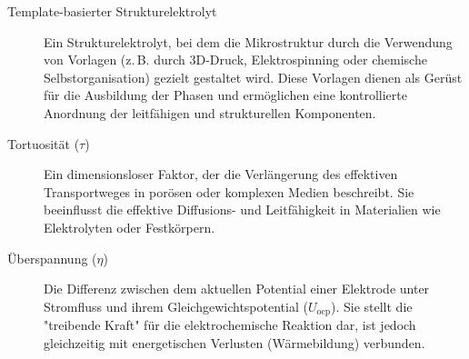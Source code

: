 \begin{description}
    \item[Template-basierter Strukturelektrolyt] Ein Strukturelektrolyt, bei dem die Mikrostruktur durch die Verwendung von Vorlagen (z.\,B. durch 3D-Druck, Elektrospinning oder chemische Selbstorganisation) gezielt gestaltet wird. Diese Vorlagen dienen als Gerüst für die Ausbildung der Phasen und ermöglichen eine kontrollierte Anordnung der leitfähigen und strukturellen Komponenten.

    \item[Tortuosität ($\tau$)] Ein dimensionsloser Faktor, der die Verlängerung des effektiven Transportweges in porösen oder komplexen Medien beschreibt. Sie beeinflusst die effektive Diffusions- und Leitfähigkeit in Materialien wie Elektrolyten oder Festkörpern.

    \item[Überspannung ($\eta$)] Die Differenz zwischen dem aktuellen Potential einer Elektrode unter Stromfluss und ihrem Gleichgewichtspotential ($U_{\text{ocp}}$). Sie stellt die "treibende Kraft" für die elektrochemische Reaktion dar, ist jedoch gleichzeitig mit energetischen Verlusten (Wärmebildung) verbunden.
\end{description}


